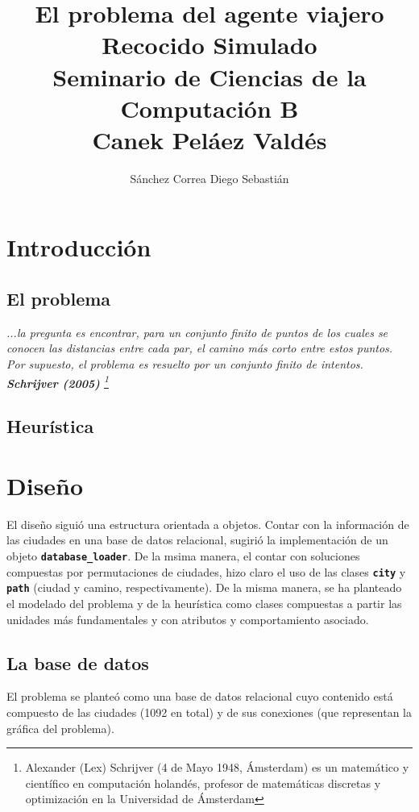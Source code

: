 \documentclass[a4paper]{report}
\title {\textbf {\Large{El problema del agente viajero}}\protect\\
  \large{\textbf{Recocido Simulado}}\protect\\ \vspace{0.4cm}
  \normalsize{\textbf{Seminario de Ciencias de la Computaci\'on B}} \protect\\ \vspace{0.2cm}
  \normalsize{Canek Pel\'aez Vald\'es}}
\date{}
\author{\normalsize Sánchez Correa Diego Sebastián}
\begin{document}
\allowdisplaybreaks
\maketitle
\tableofcontents

\chapter{Introducci\'on}
\section{El problema}

\begin{center}
  \textit{...la pregunta es encontrar, para un conjunto finito de puntos de los
    cuales se conocen las distancias entre cada par, el camino más corto entre
    estos puntos. Por supuesto, el problema es resuelto por un conjunto finito
    de intentos. \textbf{Schrijver (2005)}
    \footnote{Alexander (Lex) Schrijver (4 de Mayo 1948, \'Amsterdam) es 
      un matem\'atico y cient\'ifico en computaci\'on holand\'es,
      profesor de matem\'aticas discretas y optimizaci\'on 
      en la Universidad de \'Amsterdam}}
\end{center}

\section{Heur\'istica}
\chapter{Dise\~no}

El dise\~no sigui\'o una estructura orientada a objetos. Contar con la informaci\'on
de las ciudades en una base de datos relacional, sugiri\'o la implementaci\'on de
un objeto \textbf{\texttt{database\_loader}}. De la msima manera, el contar con soluciones
compuestas por permutaciones de ciudades, hizo claro el uso de las clases
\textbf{\texttt{city}} y \textbf{\texttt{path}} (ciudad y camino, respectivamente).
De la misma manera, se ha planteado el modelado del problema y de la heur\'istica 
como clases compuestas a partir las unidades m\'as fundamentales y con atributos y
comportamiento asociado.\\

\section{La base de datos}
El problema se plante\'o como una base de datos relacional cuyo contenido est\'a
compuesto de las ciudades (1092 en total) y de sus conexiones (que representan
la gr\'afica del problema).\\
\end{document}
